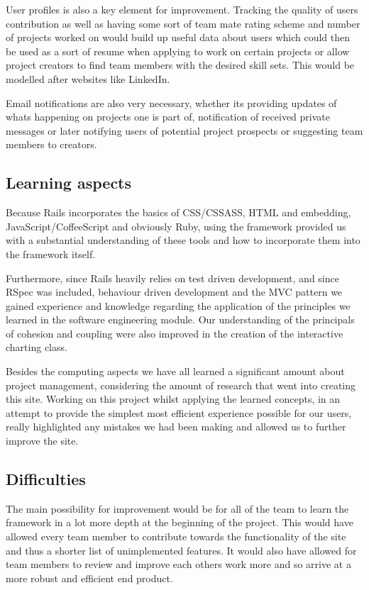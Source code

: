 \documentclass[a4wide, 11pt]{article}
\begin{document}
User profiles is also a key element for improvement. Tracking the quality of users contribution as well as having some sort of team mate rating scheme and number of projects worked on would build up useful data about users which could then be used as a sort of resume when applying to work on certain projects or allow project creators to find team members with the desired skill sets. This would be modelled after websites like LinkedIn.

Email notifications are also very necessary, whether its providing updates of whats happening on projects one is part of, notification of received private messages or later notifying users of potential project prospects or suggesting team members to creators.
 
\subsection{Learning aspects}
Because Rails incorporates the basics of CSS/CSSASS, HTML and embedding, JavaScript/CoffeeScript and obviously Ruby, using the framework provided us with a substantial understanding of these tools and how to incorporate them into the framework itself. 

Furthermore, since Rails heavily relies on test driven development, and since RSpec was included, behaviour driven development and the MVC pattern we gained experience and knowledge regarding the application of the principles we learned in the software engineering module. Our understanding of the principals of cohesion and coupling were also improved in the creation of the interactive charting class.

Besides the computing aspects we have all learned a significant amount about project management, considering the amount of research that went into creating this site. Working on this project whilst applying the learned concepts, in an attempt to provide the simplest most efficient experience possible for our users, really highlighted any mistakes we had been making and allowed us to further improve the site.
\clearpage

\subsection{Difficulties}
The main possibility for improvement would be for all of the team to learn the framework in a lot more depth at the beginning of the project. This would have allowed every team member to contribute towards the functionality of the site and thus a shorter list of unimplemented features. It would also have allowed for team members to review and improve each others work more and so arrive at a more robust and efficient end product.
\end{document}
